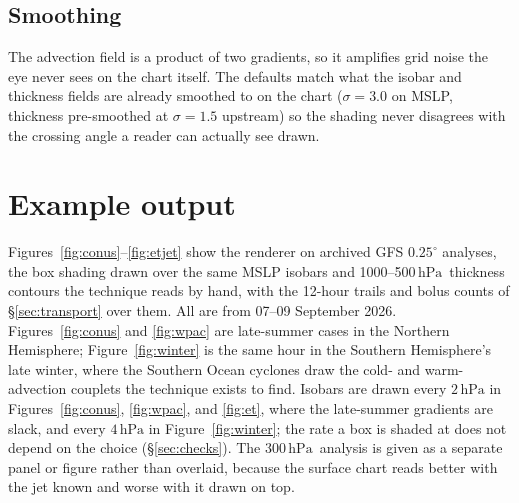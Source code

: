 \documentclass[11pt]{article}
\newcommand{\hPa}{\ensuremath{\,\mathrm{hPa}}}
\begin{document}
\subsection{Smoothing}

The advection field is a product of two gradients, so it amplifies grid noise the eye never sees on the chart itself. The defaults match what the isobar and thickness fields are already smoothed to on the chart ($\sigma = 3.0$ on MSLP, thickness pre-smoothed at $\sigma = 1.5$ upstream) so the shading never disagrees with the crossing angle a reader can actually see drawn.

\section{Example output}
\label{sec:examples}

Figures~\ref{fig:conus}--\ref{fig:etjet} show the renderer on archived GFS $0.25^\circ$ analyses, the box shading drawn over the same MSLP isobars and 1000--500\hPa\ thickness contours the technique reads by hand, with the 12-hour trails and bolus counts of \S\ref{sec:transport} over them. All are from 07--09 September 2026. Figures~\ref{fig:conus} and \ref{fig:wpac} are late-summer cases in the Northern Hemisphere; Figure~\ref{fig:winter} is the same hour in the Southern Hemisphere's late winter, where the Southern Ocean cyclones draw the cold- and warm-advection couplets the technique exists to find. Isobars are drawn every $2\hPa$ in Figures~\ref{fig:conus}, \ref{fig:wpac}, and \ref{fig:et}, where the late-summer gradients are slack, and every $4\hPa$ in Figure~\ref{fig:winter}; the rate a box is shaded at does not depend on the choice (\S\ref{sec:checks}). The 300\hPa\ analysis is given as a separate panel or figure rather than overlaid, because the surface chart reads better with the jet known and worse with it drawn on top.
\end{document}
